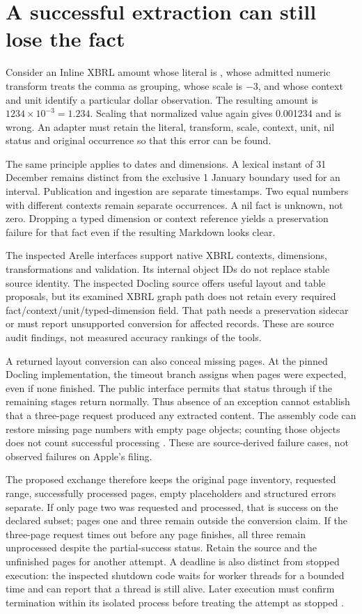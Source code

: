 \section{A successful extraction can still lose the fact}

Consider an Inline XBRL amount whose literal is , whose admitted
numeric transform treats the comma as grouping, whose scale is $-3$, and whose
context and unit identify a particular dollar observation. The resulting amount
is $1234\times10^{-3}=1.234$. Scaling that normalized value again gives 0.001234
and is wrong. An adapter must retain the literal, transform, scale, context,
unit, nil status and original occurrence so that this error can be found.

The same principle applies to dates and dimensions. A lexical instant of
31 December remains distinct from the exclusive 1 January boundary used for
an interval. Publication and ingestion are separate timestamps. Two equal
numbers with different contexts remain separate occurrences. A nil fact is
unknown, not zero. Dropping a typed dimension or context reference yields a
preservation failure for that fact even if the resulting Markdown looks clear.

The inspected Arelle interfaces support native XBRL contexts, dimensions,
transformations and validation. Its internal object IDs do not replace stable
source identity. The inspected Docling source offers useful layout and table
proposals, but its examined XBRL graph path does not retain every required
fact/context/unit/typed-dimension field. That path needs a preservation sidecar
or must report unsupported conversion for affected records. These are source
audit findings, not measured accuracy rankings of the tools.

A returned layout conversion can also conceal missing pages. At the pinned
Docling implementation, the timeout branch assigns 
when pages were expected, even if none finished. The public 
interface permits that status through  if the
remaining stages return normally. Thus absence of an exception cannot establish
that a three-page request produced any extracted content. The assembly code
can restore missing page numbers with empty page objects; counting those objects
does not count successful processing \citep{doclingpinned2026}. These are
source-derived failure cases, not observed failures on Apple's filing.

The proposed exchange therefore keeps the original page inventory, requested
range, successfully processed pages, empty placeholders and structured errors
separate. If only page two was requested and processed, that is success on the
declared subset; pages one and three remain outside the conversion claim. If
the three-page request times out before any page finishes, all three remain
unprocessed despite the partial-success status. Retain the source and the
unfinished pages for another attempt. A deadline is also distinct from stopped
execution: the inspected shutdown code waits for worker threads for a bounded
time and can report that a thread is still alive. Later execution must confirm
termination within its isolated process before treating the attempt as stopped
\citep{doclingpinned2026}.

